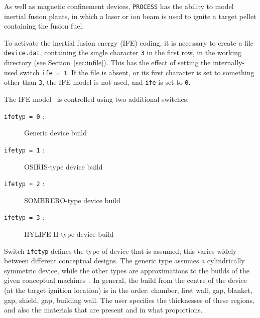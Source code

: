 \documentclass[11pt,a4paper]{report}
\newcommand{\process}{\mbox{\texttt{PROCESS}}}
\begin{document}
As well as magnetic confinement devices, \process\/ has the ability to model
inertial fusion plants, in which a laser or ion beam is used to ignite a
target pellet containing the fusion fuel.

To activate the inertial fusion energy (IFE) coding, it is necessary to create
a file \texttt{device.dat}, containing the single character \texttt{3} in the
first row, in the working directory (see Section~\ref{sec:infile}). This has
the effect of setting the internally-used switch \texttt{ife = 1}. If the file
is absent, or its first character is set to something other than \texttt{3},
the IFE model is not used, and \texttt{ife} is set to \texttt{0}.

The IFE model~\cite{process_ife} is controlled using two additional switches.
\begin{description}
\item [\texttt{ifetyp = 0} :] Generic device build
\item [\texttt{ifetyp = 1} :] OSIRIS-type device build~\cite{osiris1,osiris2,osiris3}
\item [\texttt{ifetyp = 2} :] SOMBRERO-type device build~\cite{sombrero1,sombrero2}
\item [\texttt{ifetyp = 3} :] HYLIFE-II-type device build~\cite{hylife1,hylife2,hylife3}
\end{description}
Switch \texttt{ifetyp} defines the type of device that is assumed; this varies
widely between different conceptual designs. The generic type assumes a
cylindrically symmetric device, while the other types are approximations to
the builds of the given conceptual machines~\cite{ife_build}. In general, the
build from the centre of the device (at the target ignition location) is in
the order: chamber, first wall, gap, blanket, gap, shield, gap, building
wall. The user specifies the thicknesses of these regions, and also the
materials that are present and in what proportions. \Red{[expand]}
\end{document}
